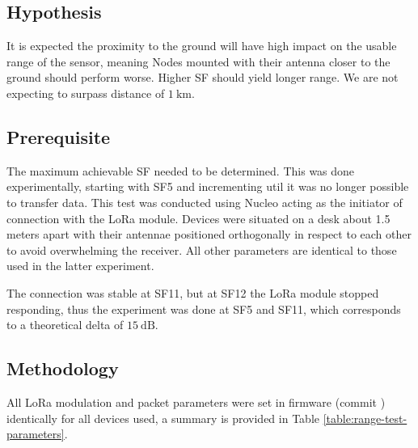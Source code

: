 \subsection{Hypothesis}
It is expected the proximity to the ground will have high impact on the usable range of the sensor, meaning Nodes mounted with their antenna closer to the ground should perform worse. Higher SF should yield longer range. We are not expecting to surpass distance of $1~\mathrm{km}$.

\subsection{\label{section:range-prerequisite}Prerequisite}
The maximum achievable SF needed to be determined. This was done experimentally, starting with SF5 and incrementing util it was no longer possible to transfer data. This test was conducted using Nucleo acting as the initiator of connection with the LoRa module. Devices were situated on a desk about 1.5 meters apart with their antennae positioned orthogonally in respect to each other to avoid overwhelming the receiver. All other parameters are identical to those used in the latter experiment.

The connection was stable at SF11, but at SF12 the LoRa module stopped responding, thus the experiment was done at SF5 and SF11, which corresponds to a theoretical delta of $15~\mathrm{dB}$.

\subsection{Methodology}
All LoRa modulation and packet parameters were set in firmware (commit ) identically for all devices used, a summary is provided in Table \ref{table:range-test-parameters}. 

